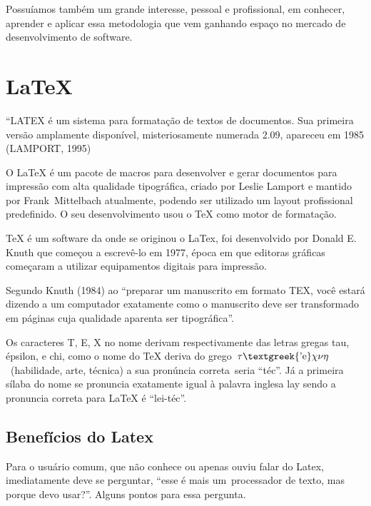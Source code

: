 {
Possu\'iamos tamb\'em um grande interesse, pessoal e profissional, em conhecer, aprender e aplicar essa metodologia que
vem ganhando espa\c{c}o no mercado de desenvolvimento de software.}


\bigskip

\section[LaTeX]{ {\LaTeX}}

\bigskip

{
{}``LATEX \'e um sistema para formata\c{c}\~ao de textos de documentos. Sua primeira vers\~ao amplamente dispon\'ivel,
misteriosamente numerada 2.09, apareceu em 1985{\textquotedbl} (LAMPORT, 1995)}

{
O {\LaTeX} \'e um pacote de macros para desenvolver e gerar documentos para impress\~ao com alta qualidade
tipogr\'afica, criado por Leslie Lamport e mantido por Frank\ Mittelbach atualmente, podendo ser utilizado um layout
profissional predefinido. O seu desenvolvimento usou o TeX como motor de formata\c{c}\~ao.}

{
TeX \'e um software da onde se originou o LaTex, foi desenvolvido por Donald E. Knuth que come\c{c}ou a escrev\^e-lo em
1977, \'epoca em que editoras gr\'aficas come\c{c}aram a utilizar equipamentos digitais para impress\~ao.}

{
Segundo Knuth (1984) ao ``preparar um manuscrito em formato TEX, voc\^e estar\'a dizendo a um computador exatamente como
o manuscrito deve ser transformado em p\'aginas cuja qualidade aparenta ser tipogr\'afica''.}

{
\textrm{Os caracteres T, E, X no nome derivam respectivamente das letras gregas tau, \'epsilon, e chi, como o nome do
TeX deriva do grego\ }\textrm{\textit{$\tau \text{\textgreek{'e}}\chi \nu \eta $}}\textrm{\ (habilidade, arte,
t\'ecnica) a sua pron\'uncia correta\ }\textrm{seria ``t\'ec''. J\'a a primeira s\'ilaba do nome se pronuncia
exatamente igual \`a palavra inglesa lay sendo a pronuncia correta para {\LaTeX} \'e ``lei-t\'ec''.}}


\bigskip

\subsection[Benef\'icios do Latex]{ Benef\'icios do Latex}

\bigskip

{
\textrm{Para o usu\'ario comum, que n\~ao conhece ou apenas ouviu falar do Latex, imediatamente deve se perguntar,
``esse \'e mais um\ processador de texto, mas porque devo usar?''. Alguns pontos para essa pergunta.}}


